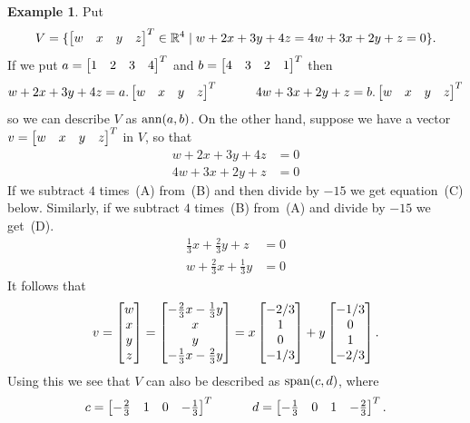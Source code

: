 \documentclass[reqno]{amsart}
\theoremstyle{definition}
\newtheorem{example}[theorem]{Example}
\begin{document}
\begin{example}\label{eg-span-ann-ii}
 Put
 \[ V = \{\left[\begin{matrix} w&x&y&z\end{matrix}\right]^T\in{\mathbb{R}}^4\;|\; w+2x+3y+4z=4w+3x+2y+z=0\}. \]
 If we put $a=\left[\begin{matrix} 1&2&3&4\end{matrix}\right]^T$ and $b=\left[\begin{matrix} 4&3&2&1\end{matrix}\right]^T$ then
 \[ w+2x+3y+4z = a.\left[\begin{matrix} w&x&y&z\end{matrix}\right]^T \hspace{3em}
    4w+3x+2y+z = b.\left[\begin{matrix} w&x&y&z\end{matrix}\right]^T
 \]
 so we can describe $V$ as $\operatorname{ann}(a,b)$.  On the other hand, suppose we
 have a vector $v=\left[\begin{matrix} w&x&y&z\end{matrix}\right]^T$ in $V$, so that
 \begin{align*}
  w+2x+3y+4z &= 0 \tag{A} \\
  4w+3x+2y+z &= 0 \tag{B}
 \end{align*}
 If we subtract $4$ times~(A) from~(B) and then divide by $-15$ we get
 equation~(C) below.  Similarly, if we subtract $4$ times~(B) from~(A)
 and divide by $-15$ we get~(D).
 \begin{align*}
  \tfrac{1}{3}x + \tfrac{2}{3}y + z &= 0 \tag{C} \\
  w + \tfrac{2}{3}x + \tfrac{1}{3}y &= 0 \tag{D}
 \end{align*}
 It follows that
 \[ v
    = \left[\begin{matrix} w \\ x \\ y \\ z \end{matrix}\right]
    = \left[\begin{matrix} -\tfrac{2}{3}x - \tfrac{1}{3}y \\
           x \\ y \\
           -\tfrac{1}{3}x - \tfrac{2}{3}y \end{matrix}\right]
    = x \left[\begin{matrix} -2/3 \\ 1 \\ 0 \\ -1/3 \end{matrix}\right] +
      y \left[\begin{matrix} -1/3 \\ 0 \\ 1 \\ -2/3 \end{matrix}\right].
 \]
 Using this we see that $V$ can also be described as $\operatorname{span}(c,d)$,
 where
 \[ c = \left[\begin{matrix} -\tfrac{2}{3} & 1 & 0 & -\tfrac{1}{3} \end{matrix}\right]^T
    \hspace{3em}
    d = \left[\begin{matrix} -\tfrac{1}{3} & 0 & 1 & -\tfrac{2}{3} \end{matrix}\right]^T.
 \]
\end{example}
\end{document}
